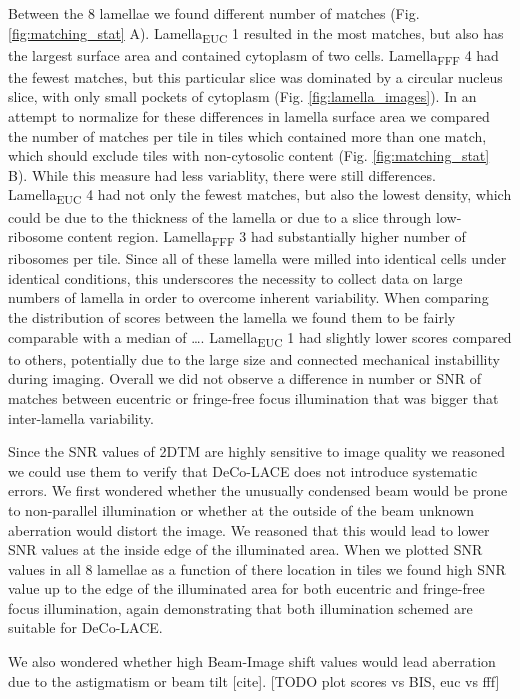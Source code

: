 \documentclass[
]{article}
\begin{document}
Between the 8 lamellae we found different number of matches (Fig.
\ref{fig:matching_stat} A). Lamella\textsubscript{EUC} 1 resulted in the most matches, but also has the largest surface area and contained
cytoplasm of two cells. Lamella\textsubscript{FFF} 4 had the fewest matches, but this particular slice was dominated by a circular
nucleus slice, with only small pockets of cytoplasm (Fig.
\ref{fig:lamella_images}). In an attempt to normalize for these differences in
lamella surface area we compared the number of matches per tile in tiles which
contained more than one match, which should exclude tiles with non-cytosolic
content (Fig. \ref{fig:matching_stat} B). While this measure had less variablity,
there were still differences. Lamella\textsubscript{EUC} 4 had not only the fewest
matches, but also the lowest density, which could be due to the thickness of the
lamella or due to a slice through low-ribosome content region. Lamella\textsubscript{FFF}
3 had substantially higher number of ribosomes per tile. Since all
of these lamella were milled into identical cells under identical conditions,
this underscores the necessity to collect data on large numbers of lamella in
order to overcome inherent variability. When comparing the distribution of
scores between the lamella we found them to be fairly comparable with a median
of \ldots. Lamella\textsubscript{EUC} 1 had slightly lower scores compared to others,
potentially due to the large size and connected mechanical instabillity during
imaging. Overall we did not observe a difference in number or SNR of matches between eucentric or fringe-free focus illumination that was bigger that inter-lamella variability.

Since the SNR values of 2DTM are highly sensitive to image quality we reasoned we could use them to verify that DeCo-LACE does not introduce systematic errors. We first wondered whether the unusually condensed beam would be prone to non-parallel illumination or whether at the outside of the beam unknown aberration would distort the image. We reasoned that this would lead to lower SNR values at the inside edge of the illuminated area. When we plotted SNR values in all 8 lamellae as a function of there location in tiles we found high SNR value up to the edge of the illuminated area for both eucentric and fringe-free focus illumination, again demonstrating that both illumination schemed are suitable for DeCo-LACE.

We also wondered whether high Beam-Image shift values would lead aberration due to the astigmatism or beam tilt {[}cite{]}. {[}TODO plot scores vs BIS, euc vs fff{]}
\end{document}

